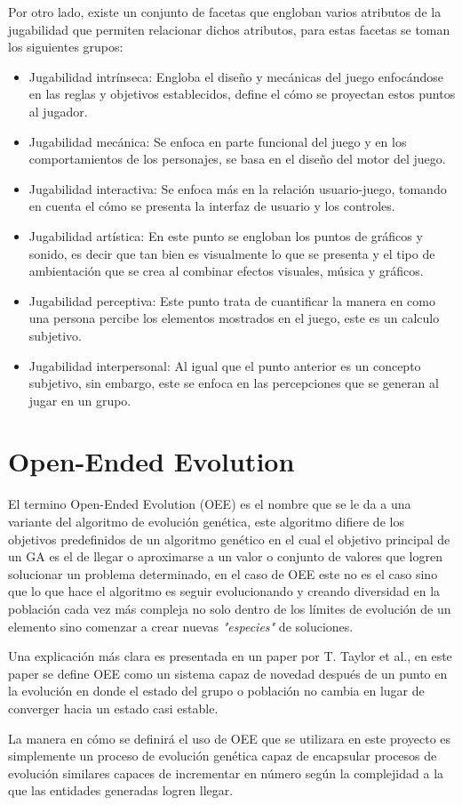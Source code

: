 Por otro lado, existe un conjunto de facetas que engloban varios atributos de la
jugabilidad que permiten relacionar dichos atributos, para estas facetas se
toman los siguientes grupos:

\begin{itemize}
    \item Jugabilidad intrínseca: Engloba el diseño y mecánicas del juego
    enfocándose en las reglas y objetivos establecidos, define el cómo se
    proyectan estos puntos al jugador.
    \item Jugabilidad mecánica: Se enfoca en parte funcional del juego y en los
    comportamientos de los personajes, se basa en el diseño del motor del juego.
    \item Jugabilidad interactiva: Se enfoca más en la relación usuario-juego,
    tomando en cuenta el cómo se presenta la interfaz de usuario y los controles.
    \item Jugabilidad artística: En este punto se engloban los puntos de
    gráficos y sonido, es decir que tan bien es visualmente lo que se presenta y
    el tipo de ambientación que se crea al combinar efectos visuales, música y gráficos.
    \item Jugabilidad perceptiva: Este punto trata de cuantificar la manera en
    como una persona percibe los elementos mostrados en el juego, este es un
    calculo subjetivo.
    \item Jugabilidad interpersonal: Al igual que el punto anterior es un
    concepto subjetivo, sin embargo, este se enfoca en las percepciones que se
    generan al jugar en un grupo.
\end{itemize}

\section{Open-Ended Evolution}
\label{section:open-ended_Evolution}

El termino Open-Ended Evolution (OEE) es el nombre que se le da a una variante
del algoritmo de evolución genética, este algoritmo difiere de los objetivos
predefinidos de un algoritmo genético en el cual el objetivo principal de un GA
es el de llegar o aproximarse a un valor o conjunto de valores que logren
solucionar un problema determinado, en el caso de OEE este no es el caso sino
que lo que hace el algoritmo es seguir evolucionando y creando diversidad en la
población cada vez más compleja no solo dentro de los límites de evolución de un
elemento sino comenzar a crear nuevas \textit{"especies"} de soluciones.

Una explicación más clara es presentada en un paper por T. Taylor et
al.\cite{Taylor2016}, en este paper se define OEE como un sistema capaz de
novedad después de un punto en la evolución en donde el estado del grupo o
población no cambia en lugar de converger hacia un estado casi estable.

La manera en cómo se definirá el uso de OEE que se utilizara en este proyecto es
simplemente un proceso de evolución genética capaz de encapsular procesos de
evolución similares capaces de incrementar en número según la complejidad a la que
las entidades generadas logren llegar.
